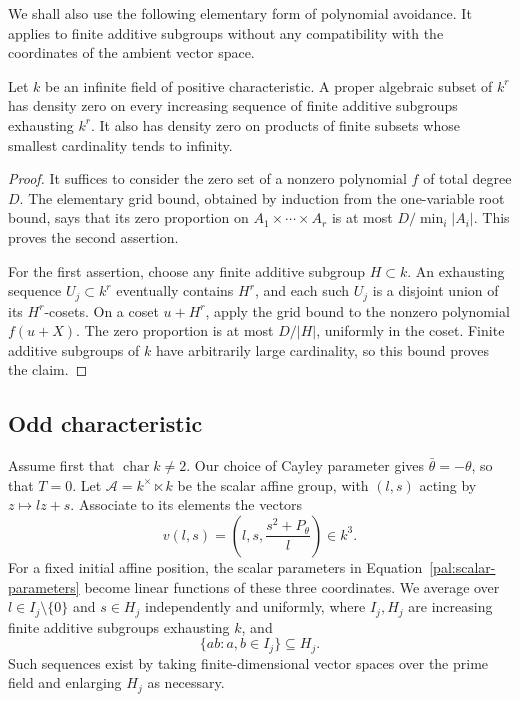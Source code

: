 We shall also use the following elementary form of polynomial avoidance.
It applies to finite additive subgroups without any compatibility with
the coordinates of the ambient vector space.

\begin{lemma}\label{rec:polynomial-density}
Let \(k\) be an infinite field of positive characteristic.  A proper
algebraic subset of \(k^r\) has density zero on every increasing sequence
of finite additive subgroups exhausting \(k^r\).  It also has density
zero on products of finite subsets whose smallest cardinality tends to
infinity.
\end{lemma}

\begin{proof}
It suffices to consider the zero set of a nonzero polynomial \(f\) of
total degree \(D\).  The elementary grid bound, obtained by induction
from the one-variable root bound, says that its zero proportion on
\(A_1\times\cdots\times A_r\) is at most
\(D/\min_i|A_i|\).  This proves the second assertion.

For the first assertion, choose any finite additive subgroup
\(H\subset k\).  An exhausting sequence \(U_j\subset k^r\) eventually
contains \(H^r\), and each such \(U_j\) is a disjoint union of its
\(H^r\)-cosets.  On a coset \(u+H^r\), apply the grid bound to the
nonzero polynomial \(f(u+X)\).  The zero proportion is at most
\(D/|H|\), uniformly in the coset.  Finite additive subgroups of \(k\)
have arbitrarily large cardinality, so this bound proves the claim.
\end{proof}

\subsection{Odd characteristic}

Assume first that \(\operatorname{char}k\ne2\).  Our choice of Cayley
parameter gives \(\bar\theta=-\theta\), so that \(T=0\).  Let
\(\mathcal A=k^\times\ltimes k\) be the scalar affine group, with
\((l,s)\) acting by \(z\mapsto lz+s\).  Associate to its elements the
vectors
\begin{equation}\label{rec:quadric}
 v(l,s)=\left(l,s,\frac{s^2+P_\theta}{l}\right)\in k^3.
\end{equation}
For a fixed initial affine position, the scalar parameters in
Equation~\ref{pal:scalar-parameters} become linear functions of these
three coordinates.  We average over \(l\in I_j\setminus\{0\}\) and \(s\in H_j\)
independently and uniformly, where \(I_j,H_j\) are increasing finite
additive subgroups exhausting \(k\), and
\[
 \{ab:a,b\in I_j\}\subseteq H_j.
\]
Such sequences exist by taking finite-dimensional vector spaces over
the prime field and enlarging \(H_j\) as necessary.

